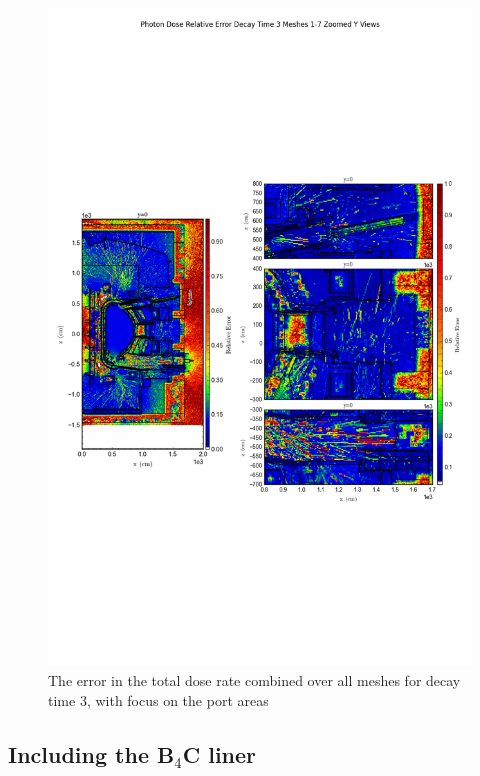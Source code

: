 \documentclass[12pt]{article}
\begin{document}
\begin{figure}[ht!]
\centering
\includegraphics[trim={0cm 9cm 0cm 10cm},clip,scale=0.75]{../plots/final_model/Photon_Dose_Relative_Error_Decay_Time_3_Meshes_1-7_Zoomed_Y_Views.png}
\caption{The error in the total dose rate combined over all meshes for decay time 3, with focus on the port areas}
\label{fig:photons_dc3_no4bc_total_error_zoomed}
\end{figure}
\clearpage
\subsection{Including the B$_4$C liner}
\end{document}
